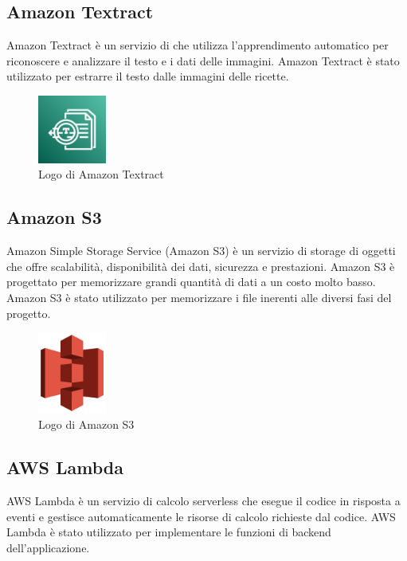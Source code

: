 \subsection{Amazon Textract}
Amazon Textract è un servizio di  che utilizza l'apprendimento automatico per riconoscere e analizzare il testo e i dati delle immagini. Amazon Textract è stato utilizzato per estrarre il testo dalle immagini delle ricette.

\begin{figure}[h]
  \centering
  \includegraphics[width=0.2\textwidth]{img/tecnologie/textract.png}
  \caption{Logo di Amazon Textract}
  \label{fig:textract}
\end{figure}

\subsection{Amazon S3}
Amazon Simple Storage Service (Amazon S3) è un servizio di storage di oggetti che offre scalabilità, disponibilità dei dati, sicurezza e prestazioni. Amazon S3 è progettato per memorizzare grandi quantità di dati a un costo molto basso. Amazon S3 è stato utilizzato per memorizzare i file inerenti alle diversi fasi del progetto.

\begin{figure}[h]
  \centering
  \includegraphics[width=0.2\textwidth]{img/tecnologie/s3.png}
  \caption{Logo di Amazon S3}
  \label{fig:s3}
\end{figure}

\subsection{AWS Lambda}
AWS Lambda è un servizio di calcolo serverless che esegue il codice in risposta a eventi e gestisce automaticamente le risorse di calcolo richieste dal codice. AWS Lambda è stato utilizzato per implementare le funzioni di backend dell'applicazione. 

